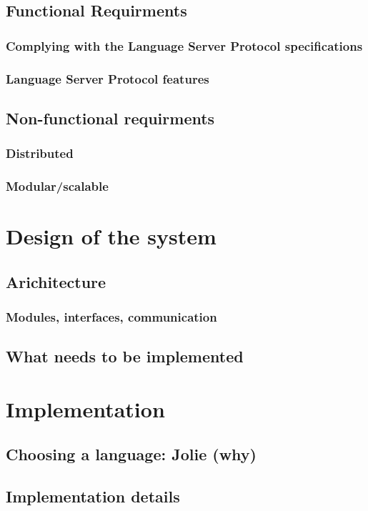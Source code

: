 \documentclass[target=bach]{thud}[2019/10/17]
\begin{document}
\section{Functional Requirments}
\subsection{Complying with the Language Server Protocol specifications}
\subsection{Language Server Protocol features}
\section{Non-functional requirments}
\subsection{Distributed}
\subsection{Modular/scalable}

\chapter{Design of the system}
\section{Arichitecture}
\subsection{Modules, interfaces, communication}
\section{What needs to be implemented}

\chapter{Implementation}
\section{Choosing a language: Jolie (why)}
\section{Implementation details}
\end{document}
